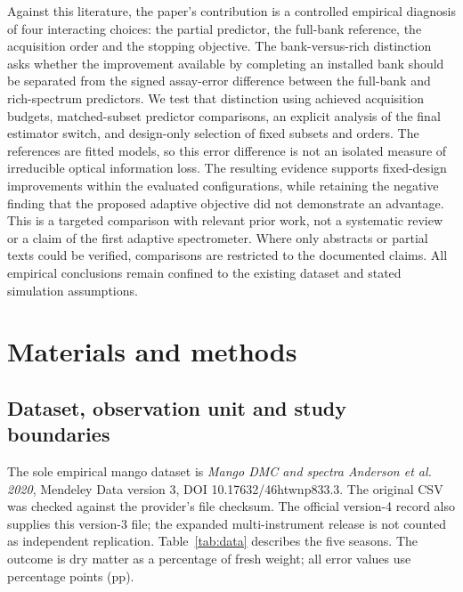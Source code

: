 \documentclass[Review,sagev,times]{sagej}
\begin{document}
Against this literature, the paper's contribution is a controlled empirical diagnosis of four interacting choices: the partial predictor, the full-bank reference, the acquisition order and the stopping objective. The bank-versus-rich distinction asks whether the improvement available by completing an installed bank should be separated from the signed assay-error difference between the full-bank and rich-spectrum predictors. We test that distinction using achieved acquisition budgets, matched-subset predictor comparisons, an explicit analysis of the final estimator switch, and design-only selection of fixed subsets and orders. The references are fitted models, so this error difference is not an isolated measure of irreducible optical information loss. The resulting evidence supports fixed-design improvements within the evaluated configurations, while retaining the negative finding that the proposed adaptive objective did not demonstrate an advantage. This is a targeted comparison with relevant prior work, not a systematic review or a claim of the first adaptive spectrometer. Where only abstracts or partial texts could be verified, comparisons are restricted to the documented claims. All empirical conclusions remain confined to the existing dataset and stated simulation assumptions.


\section{Materials and methods}
\subsection{Dataset, observation unit and study boundaries}
The sole empirical mango dataset is \emph{Mango DMC and spectra Anderson et al. 2020}, Mendeley Data version 3, DOI 10.17632/46htwnp833.3.\citep{andersondata2024} The original CSV was checked against the provider's file checksum. The official version-4 record also supplies this version-3 file; the expanded multi-instrument release is not counted as independent replication. Table~\ref{tab:data} describes the five seasons. The outcome is dry matter as a percentage of fresh weight; all error values use percentage points (pp).
\end{document}
